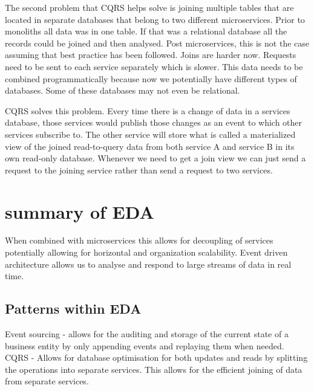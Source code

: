 \documentclass[a4paper, 11pt]{book}
\begin{document}
    The second problem that CQRS helps solve is joining multiple tables that are located in separate databases that belong to two different microservices.
    Prior to monoliths all data was in one table.
    If that was a relational database all the records could be joined and then analysed.
    Post microservices, this is not the case assuming that best practice has been followed.
    Joins are harder now.
    Requests need to be sent to each service separately which is slower.
    This data needs to be combined programmatically because now we potentially have different types of databases.
    Some of these databases may not even be relational.

    CQRS solves this problem.
    Every time there is a change of data in a services database, those services would publish those changes as an event to which other services subscribe to.
    The other service will store what is called a materialized view of the joined read-to-query data from both service A and service B in its own read-only database.
    Whenever we need to get a join view we can just send a request to the joining service rather than send a request to two services.

    \section{summary of EDA}
    When combined with microservices this allows for decoupling of services potentially allowing for horizontal and organization scalability.
    Event driven architecture allows us to analyse and respond to large streams of data in real time.

    \subsection{Patterns within EDA}
    Event sourcing - allows for the auditing and storage of the current state of a business entity by only appending events and replaying them when needed.
    CQRS - Allows for database optimisation for both updates and reads by splitting the operations into separate services.
    This allows for the efficient joining of data from separate services.
\end{document}
